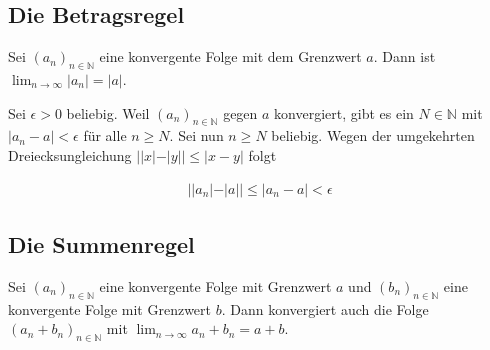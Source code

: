 \documentclass[fontsize=9pt,
               parskip=half-,
               DIV=14,
               listof=chapterentry,
               tocflat]{scrbook}
\begin{document}
\subsection{Die Betragsregel}

\begin{theorem*}
Sei $(a_{n})_{n\in \mathbb {N} }$ eine konvergente Folge mit dem Grenzwert $a$. Dann ist $\lim _{n\rightarrow \infty }|a_{n}|=|a|$.

\end{theorem*}

\begin{proof*}
Sei $\epsilon >0$ beliebig. Weil $(a_{n})_{n\in \mathbb {N} }$ gegen $a$ konvergiert, gibt es ein $N\in \mathbb {N} $ mit $|a_{n}-a|<\epsilon $ für alle $n\geq N$. Sei nun $n\geq N$ beliebig. Wegen der umgekehrten Dreiecksungleichung $||x|-|y||\leq |x-y|$ folgt

\begin{align*}
||a_{n}|-|a||\leq |a_{n}-a|<\epsilon 
\end{align*}

\end{proof*}

\subsection{Die Summenregel}

\begin{theorem*}
Sei $(a_{n})_{n\in \mathbb {N} }$ eine konvergente Folge mit Grenzwert $a$ und $(b_{n})_{n\in \mathbb {N} }$ eine konvergente Folge mit Grenzwert $b$. Dann konvergiert auch die Folge $(a_{n}+b_{n})_{n\in \mathbb {N} }$ mit $\lim _{n\rightarrow \infty }a_{n}+b_{n}=a+b$.

\end{theorem*}
\end{document}
